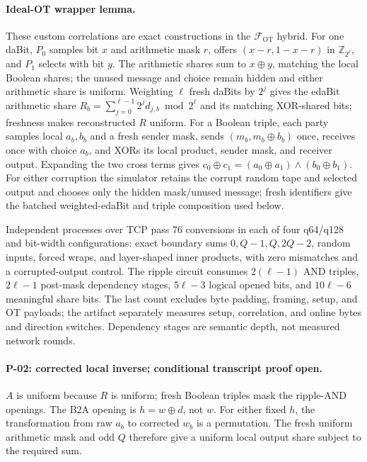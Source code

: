\documentclass[11pt]{article}
\newcommand{\Z}{\mathbb{Z}}
\newcommand{\Q}{Q}   %
\begin{document}
\paragraph{Ideal-OT wrapper lemma.}
These custom correlations are exact constructions in the
$\mathcal F_{\mathrm{OT}}$ hybrid. For one daBit, $P_0$ samples bit $x$ and
arithmetic mask $r$, offers $(x-r,1-x-r)$ in $\Z_{2^\ell}$, and $P_1$ selects
with bit $y$. The arithmetic shares sum to $x\oplus y$, matching the local
Boolean shares; the unused message and choice remain hidden and either
arithmetic share is uniform. Weighting $\ell$ fresh daBits by $2^j$ gives the
edaBit arithmetic share
$R_b=\sum_{j=0}^{\ell-1}2^j d_{j,b}\bmod2^\ell$ and its matching XOR-shared
bits; freshness makes reconstructed $R$ uniform. For a Boolean triple, each
party samples local $a_b,b_b$ and a fresh sender mask, sends
$(m_b,m_b\oplus b_b)$ once, receives once with choice $a_b$, and XORs its
local product, sender mask, and receiver output. Expanding the two cross terms
gives $c_0\oplus c_1=(a_0\oplus a_1)\wedge(b_0\oplus b_1)$. For either
corruption the simulator retains the corrupt random tape and selected output
and chooses only the hidden mask/unused message; fresh identifiers give the
batched weighted-edaBit and triple composition used below.


Independent processes over TCP pass 76 conversions in each of four q64/q128
and bit-width configurations: exact boundary sums
$0,\Q-1,\Q,2\Q-2$, random inputs, forced wraps, and layer-shaped inner
products, with zero mismatches and a corrupted-output control. The ripple
circuit consumes $2(\ell-1)$ AND triples, $2\ell-1$ post-mask dependency
stages, $5\ell-3$ logical opened bits, and $10\ell-6$ meaningful share bits.
The last count excludes byte padding, framing, setup, and OT payloads; the
artifact separately measures setup, correlation, and online bytes and
direction switches. Dependency stages are semantic depth, not measured
network rounds.

\paragraph{P-02: corrected local inverse; conditional transcript proof open.}
$A$ is uniform because $R$ is uniform; fresh Boolean triples mask the
ripple-AND openings. The B2A opening is $h=w\oplus d$, not $w$.
For either fixed $h$, the transformation from raw $a_b$ to corrected $w_b$
is a permutation. The fresh uniform arithmetic mask and odd $\Q$ therefore
give a uniform local output share subject to the required sum.
\end{document}
